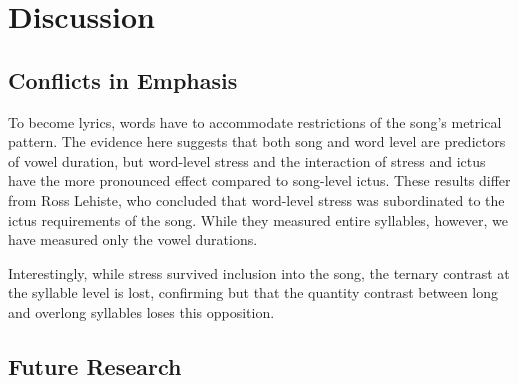 \chapter{Discussion}
%

\section{Conflicts in Emphasis}
To become lyrics, words have to accommodate restrictions of the song's metrical pattern. The evidence here suggests that both song and word level are predictors of vowel duration, but word-level stress and the interaction of stress and ictus have the more pronounced effect compared to song-level ictus. 
These results differ from Ross Lehiste, who concluded that word-level stress was subordinated to the ictus requirements of the song. While they measured entire syllables, however, we have measured only the vowel durations. 

Interestingly, while stress survived inclusion into the song, the ternary contrast at the syllable level is lost, confirming \citep{lostprosodicoppositions}
but that the quantity contrast between long and overlong syllables loses this opposition. 


\section{Future Research} 

